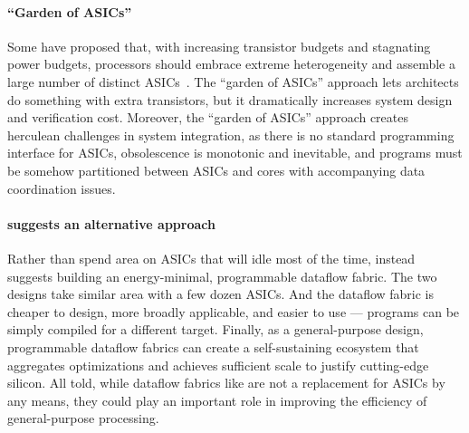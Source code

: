 \paragraph{``Garden of ASICs''}
Some have proposed that, with increasing transistor budgets and
stagnating power budgets, processors should embrace extreme
heterogeneity and assemble a large number of distinct
ASICs~\cite{venkatesh2010conservation,taylor2012dark}.
%
The ``garden of ASICs'' approach lets architects do something
with extra transistors, but it dramatically increases
system design and verification cost.
%
Moreover, the ``garden of ASICs'' approach creates herculean
challenges in system integration,
%
as there is no standard programming interface for ASICs,
obsolescence is monotonic and inevitable,
and programs must be somehow partitioned between ASICs
and cores with accompanying data coordination issues.

\paragraph{\riptide suggests an alternative approach}
Rather than spend area on ASICs that will idle most of the time, instead \riptide suggests building an energy-minimal, programmable dataflow fabric.
%
The two designs take similar area with a few dozen ASICs.
%
And the dataflow fabric is cheaper to design, more broadly applicable,
and easier to use --- programs can be simply compiled for a
different target.
%
Finally, as a general-purpose design, programmable dataflow fabrics
can create a self-sustaining ecosystem that aggregates optimizations
and achieves sufficient scale to justify cutting-edge silicon.
%
All told, while dataflow fabrics like \riptide are not a replacement
for ASICs by any means, they could play an important role in
improving the efficiency of general-purpose processing.